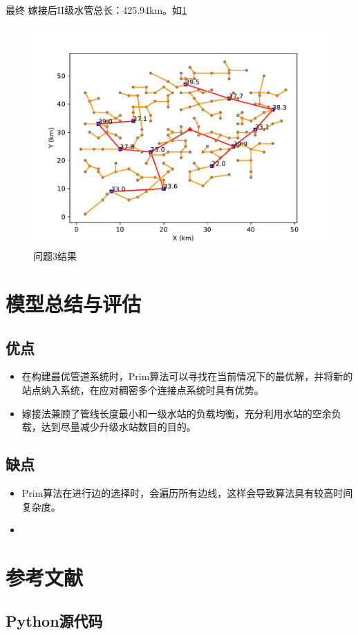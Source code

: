 \documentclass{cumcmthesis}
\begin{document}
最终
嫁接后II级水管总长：425.94km。如\cref{fig:pipline_graft_cut_9}
\begin{figure}[!h]
  \centering
  \includegraphics[width=.9\textwidth]{figure/pipline_graft_cut_9.pdf}
  \caption{问题3结果}
  \label{fig:pipline_graft_cut_9}
\end{figure}

\newpage

\section{模型总结与评估}
\subsection{优点}
\begin{itemize}
\item 在构建最优管道系统时，Prim算法可以寻找在当前情况下的最优解，并将新的站点纳入系统，在应对稠密多个连接点系统时具有优势。
\item 嫁接法兼顾了管线长度最小和一级水站的负载均衡，充分利用水站的空余负载，达到尽量减少升级水站数目的目的。
\end{itemize}
\subsection{缺点}
\begin{itemize}
\item Prim算法在进行边的选择时，会遍历所有边线，这样会导致算法具有较高时间复杂度。
\item

\end{itemize}
\section{参考文献}
\newpage
\begin{appendices}
  \section{Python源代码}
  \begin{lstlisting}[language=python]
  \end{lstlisting}

\end{appendices}
\end{document}

